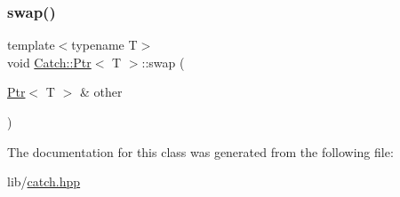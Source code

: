 \hypertarget{class_catch_1_1_ptr_a172bf8b4e71e26a5a4d92f5b02158b50}{}\label{class_catch_1_1_ptr_a172bf8b4e71e26a5a4d92f5b02158b50} 
\subsubsection{\texorpdfstring{swap()}{swap()}}
{\footnotesize\ttfamily template$<$typename T$>$ \\
void \hyperlink{class_catch_1_1_ptr}{Catch\+::\+Ptr}$<$ T $>$\+::swap (\begin{DoxyParamCaption}\item[{\hyperlink{class_catch_1_1_ptr}{Ptr}$<$ T $>$ \&}]{other }\end{DoxyParamCaption})\hspace{0.3cm}{\ttfamily [inline]}}



The documentation for this class was generated from the following file\+:\begin{DoxyCompactItemize}
\item 
lib/\hyperlink{catch_8hpp}{catch.\+hpp}\end{DoxyCompactItemize}
